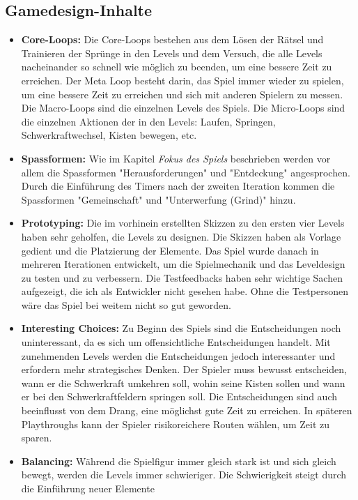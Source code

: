 \documentclass{article}
\begin{document}
\subsection{Gamedesign-Inhalte}

\begin{itemize}
    \item \textbf{Core-Loops:} Die Core-Loops bestehen aus dem Lösen der Rätsel und Trainieren der Sprünge in den Levels und dem Versuch, die alle Levels nacheinander so schnell wie möglich zu beenden, um eine bessere Zeit zu erreichen.
    Der Meta Loop besteht darin, das Spiel immer wieder zu spielen, um eine bessere Zeit zu erreichen und sich mit anderen Spielern zu messen.
    Die Macro-Loops sind die einzelnen Levels des Spiels.
    Die Micro-Loops sind die einzelnen Aktionen der in den Levels: Laufen, Springen, Schwerkraftwechsel, Kisten bewegen, etc.
    \item \textbf{Spassformen:} Wie im Kapitel \textit{Fokus des Spiels} beschrieben werden vor allem die Spassformen "Herausforderungen" und "Entdeckung" angesprochen. 
    Durch die Einführung des Timers nach der zweiten Iteration kommen die Spassformen "Gemeinschaft" und "Unterwerfung (Grind)" hinzu.
    \item \textbf{Prototyping:} Die im vorhinein erstellten Skizzen zu den ersten vier Levels haben sehr geholfen, die Levels zu designen. Die Skizzen haben als Vorlage gedient und die Platzierung der Elemente.  
    Das Spiel wurde danach in mehreren Iterationen entwickelt, um die Spielmechanik und das Leveldesign zu testen und zu verbessern.
    Die Testfeedbacks haben sehr wichtige Sachen aufgezeigt, die ich als Entwickler nicht gesehen habe. Ohne die Testpersonen wäre das Spiel bei weitem nicht so gut geworden.
    \item \textbf{Interesting Choices:} Zu Beginn des Spiels sind die Entscheidungen noch uninteressant, da es sich um offensichtliche Entscheidungen handelt.
    Mit zunehmenden Levels werden die Entscheidungen jedoch interessanter und erfordern mehr strategisches Denken. Der Spieler muss bewusst entscheiden, wann er die Schwerkraft umkehren
    soll, wohin seine Kisten sollen und wann er bei den Schwerkraftfeldern springen soll. Die Entscheidungen sind auch beeinflusst von dem Drang, eine möglichst gute Zeit zu erreichen.
    In späteren Playthroughs kann der Spieler risikoreichere Routen wählen, um Zeit zu sparen.
    \item \textbf{Balancing:} Während die Spielfigur immer gleich stark ist und sich gleich bewegt, werden die Levels immer schwieriger. Die Schwierigkeit steigt durch die Einführung neuer Elemente

\end{itemize}
\end{document}
